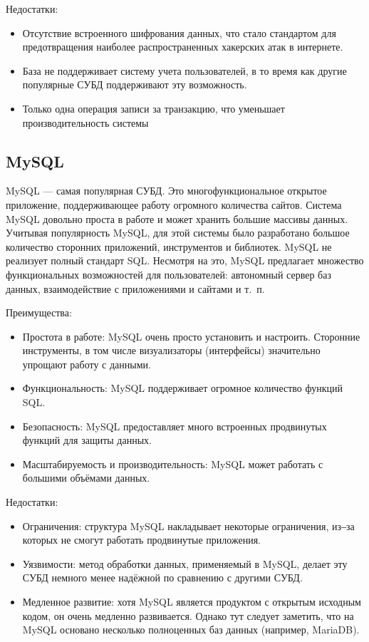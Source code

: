 Недостатки:
\begin{itemize}
	\item Отсутствие встроенного шифрования данных, что стало стандартом для предотвращения наиболее распространенных хакерских атак в интернете.
	\item База не поддерживает систему учета пользователей, в то время как другие популярные СУБД поддерживают эту возможность.
	\item Только одна операция записи за транзакцию, что уменьшает производительность системы
\end{itemize}

\subsection{MySQL}

MySQL — самая популярная СУБД.
Это многофункциональное открытое приложение, поддерживающее работу огромного количества сайтов.
Система MySQL довольно проста в работе и может хранить большие массивы данных.
Учитывая популярность MySQL, для этой системы было разработано большое количество сторонних приложений, инструментов и библиотек.
MySQL не реализует полный стандарт SQL.
Несмотря на это, MySQL предлагает множество функциональных возможностей для пользователей: автономный сервер баз данных, взаимодействие с приложениями и сайтами и т.~п.

Преимущества:
\begin{itemize}
	\item Простота в работе: MySQL очень просто установить и настроить.
	Сторонние инструменты, в том числе визуализаторы (интерфейсы) значительно упрощают работу с данными.
	\item Функциональность: MySQL поддерживает огромное количество функций SQL.
	\item Безопасность: MySQL предоставляет много встроенных продвинутых функций для защиты данных.
	\item Масштабируемость и производительность: MySQL может работать с большими объёмами данных.
\end{itemize}

Недостатки:
\begin{itemize}
	\item Ограничения: структура MySQL накладывает некоторые ограничения, из‒за которых не смогут работать продвинутые приложения.
	\item Уязвимости: метод обработки данных, применяемый в MySQL, делает эту СУБД немного менее надёжной по сравнению с другими СУБД.
	\item Медленное развитие: хотя MySQL является продуктом с открытым исходным кодом, он очень медленно развивается.
	Однако тут следует заметить, что на MySQL основано несколько полноценных баз данных (например, MariaDB).
\end{itemize}

